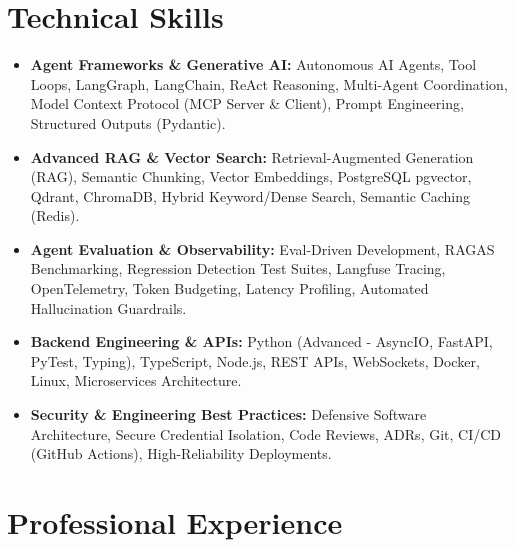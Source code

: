 \documentclass[a4paper,10pt]{article}
\begin{document}
\section{Technical Skills}
\begin{itemize}[leftmargin=1.2em, itemsep=2pt]
  \item \textbf{Agent Frameworks \& Generative AI:} Autonomous AI Agents, Tool Loops, LangGraph, LangChain, ReAct Reasoning, Multi-Agent Coordination, Model Context Protocol (MCP Server \& Client), Prompt Engineering, Structured Outputs (Pydantic).
  \item \textbf{Advanced RAG \& Vector Search:} Retrieval-Augmented Generation (RAG), Semantic Chunking, Vector Embeddings, PostgreSQL pgvector, Qdrant, ChromaDB, Hybrid Keyword/Dense Search, Semantic Caching (Redis).
  \item \textbf{Agent Evaluation \& Observability:} Eval-Driven Development, RAGAS Benchmarking, Regression Detection Test Suites, Langfuse Tracing, OpenTelemetry, Token Budgeting, Latency Profiling, Automated Hallucination Guardrails.
  \item \textbf{Backend Engineering \& APIs:} Python (Advanced - AsyncIO, FastAPI, PyTest, Typing), TypeScript, Node.js, REST APIs, WebSockets, Docker, Linux, Microservices Architecture.
  \item \textbf{Security \& Engineering Best Practices:} Defensive Software Architecture, Secure Credential Isolation, Code Reviews, ADRs, Git, CI/CD (GitHub Actions), High-Reliability Deployments.
\end{itemize}

\section{Professional Experience}
\end{document}
